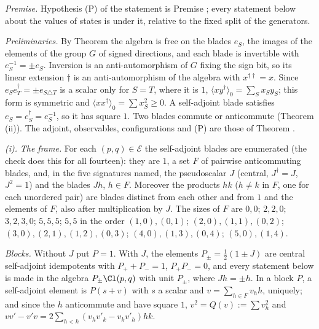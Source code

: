 \emph{Premise.} Hypothesis (P) of the statement is Premise ; every statement below about the values of states is under it, relative to the fixed split of the generators.

\emph{Preliminaries.} By Theorem  the algebra is free on the blades $e_{S}$, the images of the elements of the group $G$ of signed directions, and each blade is invertible with $e_{S}^{-1} = \pm e_{S}$. Inversion is an anti-automorphism of $G$ fixing the sign bit, so its linear extension $\dagger$ is an anti-automorphism of the algebra with $x^{\dagger\dagger} = x$. Since $e_{S}e_{T}^{\dagger} = \pm e_{S \triangle T}$ is a scalar only for $S = T$, where it is $1$, $\langle xy^{\dagger}\rangle_{0} = \sum_{S}x_{S}y_{S}$; this form is symmetric and $\langle xx^{\dagger}\rangle_{0} = \sum x_{S}^{2} \ge 0$. A self-adjoint blade satisfies $e_{S} = e_{S}^{\dagger} = e_{S}^{-1}$, so it has square $1$. Two blades commute or anticommute (Theorem (ii)). The adjoint, observables, configurations and (P) are those of Theorem .

\emph{(i).} \emph{The frame.} For each $(p,q) \in \mathcal{E}$ the self-adjoint blades are enumerated (the check does this for all fourteen): they are $1$, a set $F$ of pairwise anticommuting blades, and, in the five signatures named, the pseudoscalar $J$ (central, $J^{\dagger} = J$, $J^{2} = 1$) and the blades $Jh$, $h \in F$. Moreover the products $hk$ ($h \ne k$ in $F$, one for each unordered pair) are blades distinct from each other and from $1$ and the elements of $F$, also after multiplication by $J$. The sizes of $F$ are $0, 0$; $2, 2, 0$; $3, 2, 3, 0$; $5, 5, 5$; $5, 5$ in the order $(1,0), (0,1)$; $(2,0), (1,1), (0,2)$; $(3,0), (2,1), (1,2), (0,3)$; $(4,0), (1,3), (0,4)$; $(5,0), (1,4)$.

\emph{Blocks.} Without $J$ put $P = 1$. With $J$, the elements $P_{\pm} = \tfrac12(1 \pm J)$ are central self-adjoint idempotents with $P_{+} + P_{-} = 1$, $P_{+}P_{-} = 0$, and every statement below is made in the algebra $P_{\pm}\Cl(p,q)$ with unit $P_{\pm}$, where $Jh = \pm h$. In a block $P$, a self-adjoint element is $P(s + v)$ with $s$ a scalar and $v = \sum_{h \in F}v_{h}h$, uniquely; and since the $h$ anticommute and have square $1$, $v^{2} = Q(v) := \sum v_{h}^{2}$ and $vv' - v'v = 2\sum_{h < k}(v_{h}v'_{k} - v_{k}v'_{h})hk$.

